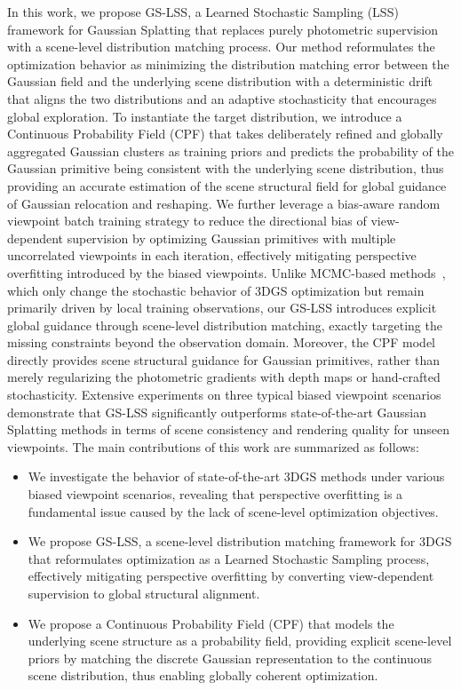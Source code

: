 \documentclass[lettersize,journal]{IEEEtran}
\begin{document}
In this work, we propose GS-LSS, a Learned Stochastic Sampling (LSS) framework for Gaussian Splatting that replaces purely photometric supervision with a scene-level distribution matching process. 
Our method reformulates the optimization behavior as minimizing the distribution matching error between the Gaussian field and the underlying scene distribution with a deterministic drift that aligns the two distributions and an adaptive stochasticity that encourages global exploration. 
To instantiate the target distribution, we introduce a Continuous Probability Field (CPF) that takes deliberately refined and globally aggregated Gaussian clusters as training priors and predicts the probability of the Gaussian primitive being consistent with the underlying scene distribution, thus providing an accurate estimation of the scene structural field for global guidance of Gaussian relocation and reshaping.
We further leverage a bias-aware random viewpoint batch training strategy to reduce the directional bias of view-dependent supervision by optimizing Gaussian primitives with multiple uncorrelated viewpoints in each iteration, effectively mitigating perspective overfitting introduced by the biased viewpoints.
{
Unlike MCMC-based methods~\cite{mcmc,mh3dgs}, 
which only change the stochastic behavior of 3DGS optimization 
but remain primarily driven by local training observations, 
our GS-LSS introduces explicit global guidance through scene-level distribution matching, exactly targeting the missing constraints beyond the observation domain. 
Moreover, the CPF model directly provides scene structural guidance for Gaussian primitives, rather than merely regularizing the photometric gradients with depth maps or hand-crafted stochasticity.}
Extensive experiments on three typical biased viewpoint scenarios demonstrate that GS-LSS significantly outperforms state-of-the-art Gaussian Splatting methods in terms of scene consistency and rendering quality for unseen viewpoints. 
The main contributions of this work are summarized as follows:
\begin{itemize}
    \item We investigate the behavior of state-of-the-art 3DGS methods under various biased viewpoint scenarios, revealing that perspective overfitting is a fundamental issue caused by the lack of scene-level optimization objectives.
    \item We propose GS-LSS, a scene-level distribution matching framework for 3DGS that reformulates optimization as a Learned Stochastic Sampling process, effectively mitigating perspective overfitting by converting view-dependent supervision to global structural alignment.
    \item We propose a Continuous Probability Field (CPF) that models the underlying scene structure as a probability field, providing explicit scene-level priors by matching the discrete Gaussian representation to the continuous scene distribution, thus enabling globally coherent optimization.
\end{itemize}
\end{document}
